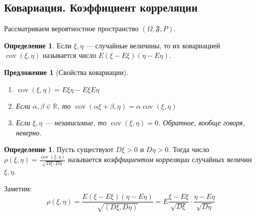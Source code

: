 \documentclass[11pt,openany,a4paper]{scrartcl}
\theoremstyle{plain}
\newtheorem{proposition}[theorem]{Предложение}
\theoremstyle{definition}
\newtheorem{definition}[theorem]{Определение}
\newcommand\mb{\mathbb}
\newcommand\real{\mb R}
\DeclareMathOperator{\cov}{cov}
\begin{document}
\subsection{Ковариация. Коэффициент корреляции}

Рассматриваем вероятностное пространство $(\Omega, \mathfrak F, P)$.

\begin{definition}
    Если $\xi, \eta$ — случайные величины, то их ковариацией $\cov (\xi, \eta)$
    называется число $E(\xi - E\xi)(\eta - E\eta)$.
\end{definition}
\begin{proposition}[Свойства ковариации]
\mbox{}
    \begin{enumerate}
        \item $\cov(\xi, \eta) = E\xi\eta - E\xi E\eta$
        \item Если $\alpha, \beta \in \real$, то $\cov(\alpha\xi + \beta, \eta) =
        \alpha\cov(\xi, \eta)$
        \item Если $\xi, \eta$ — независимые, то $\cov(\xi, \eta) = 0$. Обратное,
        вообще говоря, неверно.
    \end{enumerate}
\end{proposition}
\begin{definition}
    Пусть существуют $D\xi > 0$ и $D\eta > 0$. Тогда число $\rho(\xi, \eta) =
    \frac{\cov(\xi, \eta)}{\sqrt{D\xi\cdot D\eta}}$ называется \emph{коэффициентом
    корреляции} случайных величин $\xi, \eta$.
\end{definition}

Заметим:
$$
\rho(\xi, \eta) =
\frac{E(\xi - E\xi)(\eta - E\eta)}{\sqrt{(D\xi, D\eta)}} =
E\frac{\xi - E\xi}{\sqrt{D\xi}}\cdot \frac{\eta - E\eta}{\sqrt{D\eta}}
$$
\end{document}
